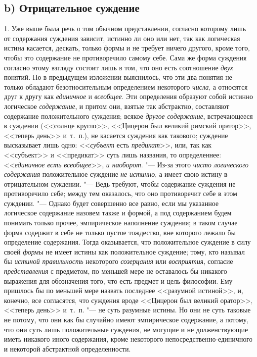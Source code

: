 {\subsection[b) Отрицательное суждение]{b) Отрицательное суждение}
1. Уже выше была речь о том обычном представлении, согласно
которому лишь от содержания суждения зависит, истинно ли оно или нет, так
как логическая истина касается, дескать, только формы и не требует ничего
другого, кроме того, чтобы это содержание не противоречило самому себе.
Сама же форма суждения согласно этому взгляду состоит лишь в том, что оно
есть соотношение {\em двух}
понятий. Но в предыдущем изложении выяснилось, что эти два
понятия не только обладают безотносительным определением некоторого
{\em числа}, а относятся
друг к другу как {\em единичное}
и {\em всеобщее}.
Эти определения образуют собой истинно логическое
{\em содержание}, и
притом они, взятые так абстрактно, составляют содержание положительного
суждения; всякое {\em другое
содержание}, встречающееся в суждении (<<солнце кругло>>,
<<Цицерон был великий римский оратор>>, <<теперь день>> и~т.~п.), не касается
суждения как такового; суждение высказывает лишь одно:
<<{\em субъект} есть
{\em предикат}>>, или, так
как <<субъект>> и <<предикат>> суть лишь названия, то определеннее:
<<{\em единичное есть всеобщее}>>,
{\em и наоборот}. "--- Из-за
этого {\em чисто логического содержания
}положительное суждение
{\em не истинно}, а имеет
свою истину в отрицательном суждении. "--- Ведь требуют, чтобы
содержание суждения не противоречило себе; между тем оказалось, что оно
противоречит себе в этом суждении. "--- Однако будет совершенно
все равно, если мы указанное логическое содержание назовем также и формой,
а под содержанием будем понимать только прочее, эмпирическое наполнение
суждения; в таком случае форма содержит в себе не только пустое тождество,
вне которого лежало бы определение содержания. Тогда оказывается, что
положительное суждение в силу своей
{\em формы} не имеет
истины как положительное суждение; тому, кто называл бы
{\em истиной правильность}
некоторого
{\em созерцания} или
{\em восприятия},
согласие
{\em представления} с
предметом, по меньшей мере не оставалось бы никакого выражения для
обозначения того, что есть предмет и цель философии. Ему пришлось бы по
меньшей мере назвать последнее <<разумной истиной>>, и, конечно, все
согласятся, что суждения вроде <<Цицерон был великий оратор>>, <<теперь день>>
и~т.~п. "--- не суть разумные истины. Но они не суть таковые не
потому, что они как бы случайно имеют эмпирическое содержание, а потому,
что они суть лишь положительные суждения, не могущие и не долженствующие
иметь никакого иного содержания, кроме некоторого
непосредственно-единичного и некоторой абстрактной определенности.

}

